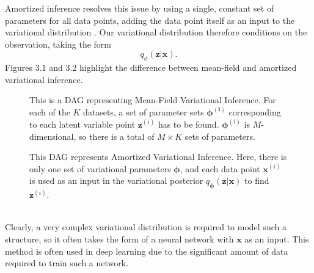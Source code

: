 \documentclass[honours,12pt]{unswthesis}
\numberwithin{equation}{section}
\theoremstyle{definition}
\begin{document}
Amortized inference resolves this issue by using a single, constant set of parameters for all data points, adding the data point itself as an input to the variational distribution \citep{ADVVI}. Our variational distribution therefore conditions on the observation, taking the form
\[q_\phi(\bm{z}|\bm{x}).\]
Figures 3.1 and 3.2 highlight the difference between mean-field and amortized variational inference.
\begin{figure}[h]
  \centering
   \caption{\small This is a DAG representing Mean-Field Variational Inference. For each of the $K$ datasets, a set of parameter sets $\bm{\phi^{(i)}}$ corresponding to each latent variable point $\bm{z}^{(i)}$ has to be found. $\bm{\phi}^{(i)}$ is $M$-dimensional, so there is a total of $M\times K$ sets of parameters.}
\end{figure}
\begin{figure}[h]
\centering
  \caption{\small This DAG represents Amortized Variational Inference. Here, there is only one set of variational parameters $\bm{\phi}$, and each data point $\bm{x}^{(i)}$ is used as an input in the variational posterior $q_{\bm{\phi}}(\bm{z}|\bm{x})$ to find $\bm{z}^{(i)}$.}
\end{figure}\\
Clearly, a very complex variational distribution is required to model such a structure, so it often takes the form of a neural network with $\bm{x}$ as an input. This method is often used in deep learning due to the significant amount of data required to train such a network.
\end{document}
